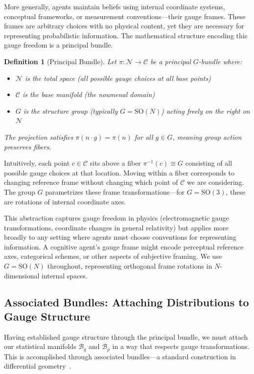 \documentclass[11pt]{article}
\newtheorem{definition}{Definition}
\begin{document}
More generally, agents maintain beliefs using internal coordinate systems, conceptual frameworks, or measurement conventions---their gauge frames. These frames are arbitrary choices with no physical content, yet they are necessary for representing probabilistic information. The mathematical structure encoding this gauge freedom is a principal bundle.

\begin{definition}[Principal Bundle]
Let $\pi: \mathcal{N} \to \mathcal{C}$ be a principal $G$-bundle where:
\begin{itemize}
\item $\mathcal{N}$ is the total space (all possible gauge choices at all base points)
\item $\mathcal{C}$ is the base manifold (the noumenal domain)
\item $G$ is the structure group (typically $G = \mathrm{SO}(N)$) acting freely on the right on $\mathcal{N}$
\end{itemize}
The projection satisfies $\pi(n \cdot g) = \pi(n)$ for all $g \in G$, meaning group action preserves fibers.
\end{definition}

Intuitively, each point $c \in \mathcal{C}$ sits above a fiber $\pi^{-1}(c) \cong G$ consisting of all possible gauge choices at that location. Moving within a fiber corresponds to changing reference frame without changing which point of $\mathcal{C}$ we are considering. The group $G$ parametrizes these frame transformations---for $G = \mathrm{SO}(3)$, these are rotations of internal coordinate axes.

This abstraction captures gauge freedom in physics (electromagnetic gauge transformations, coordinate changes in general relativity) but applies more broadly to any setting where agents must choose conventions for representing information. A cognitive agent's gauge frame might encode perceptual reference axes, categorical schemes, or other aspects of subjective framing. We use $G = \mathrm{SO}(N)$ throughout, representing orthogonal frame rotations in $N$-dimensional internal spaces.

\subsection{Associated Bundles: Attaching Distributions to Gauge Structure}

Having established gauge structure through the principal bundle, we must attach our statistical manifolds $\mathcal{B}_q$ and $\mathcal{B}_p$ in a way that respects gauge transformations. This is accomplished through associated bundles---a standard construction in differential geometry~\cite{Nakahara2003}.
\end{document}

